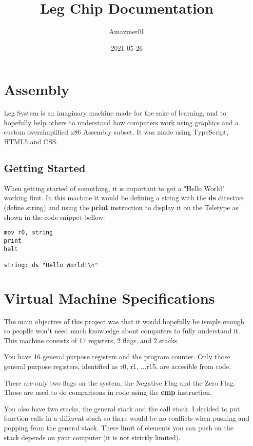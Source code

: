 \documentclass[oneside]{book}
\title{Leg Chip Documentation}
\date{2021-05-26}
\author{Amaziner01}
\begin{document}
  \maketitle
  \newpage

\tableofcontents
\clearpage

\chapter{Assembly}

Leg System is an imaginary machine made for the sake of learning, and to hopefully help others to understand how computers work using graphics and a custom oversimplified x86 Assembly subset. It was made using TypeScript, HTML5 and CSS.

\section{Getting Started}

When getting started of something, it is important to get a "Hello World" working first. In this machine it would be defining a string with the \textbf{ds} directive (define string) and using the \textbf{print} instruction to display it on the Teletype as shown in the code snippet bellow:

\begin{Verbatim}
mov r0, string
print
halt

string: ds "Hello World!\n"
\end{Verbatim}


\chapter{Virtual Machine Specifications}

The main objective of this project was that it would hopefully be ismple enough so peoplle won't need much knowledge about computers to fully understand it. This machine consists of 17 registers, 2 flags, and 2 stacks.

You have 16 general purpose registers and the program counter. Only those general purpose registers, identified as r0, r1, ...r15, are accesible from code.

There are only two flags on the system, the Negative Flag and the Zero Flag. Those are used to do comparisons in code using the \textbf{cmp} instruction.

You also have two stacks, the general stack and the call stack. I decided to put function calls in a different stack so there would be no conflicts when pushing and popping from the general stack. There limit of elements you can push on the stack depends on your computer (it is not strictly limited).
\end{document}
